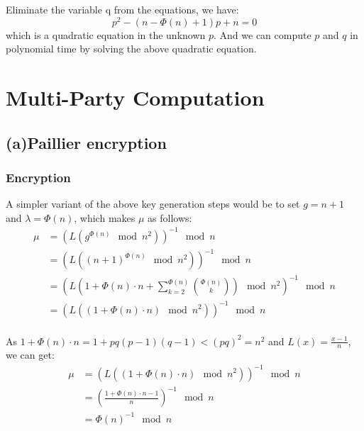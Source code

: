 \documentclass[a4paper,12pt]{article}
\begin{document}
Eliminate the variable q from the equations, we have:
\begin{equation}
    p^2 - (n - \Phi(n) + 1)p + n = 0
\end{equation}
which is a quadratic equation in the unknown $p$. And we can compute $p$ and $q$ in polynomial time by solving the above quadratic equation.

\section{Multi-Party Computation}
\subsection{(a)Paillier encryption}
\subsubsection{Encryption}
A simpler variant of the above key generation steps would be to set $g = n + 1$ and $\lambda = \Phi(n)$, which makes $\mu$ as follows:
\begin{equation}
    \begin{aligned}
        \mu & = (L(g^{\Phi(n)} \mod n^2))^{-1} \mod n                                                            \\
            & = (L((n + 1)^{\Phi(n)} \mod n^2))^{-1} \mod n                                                      \\
            & = (L(1 + \Phi(n)\cdot n + \sum\limits_{k = 2}^{\Phi(n)}\binom{\Phi(n)}{k}) \mod n^2)^{-1} \mod n \\
            & = (L((1 + \Phi(n)\cdot n) \mod n^2))^{-1} \mod n                                                 \\
    \end{aligned}
\end{equation}

As $1 + \Phi(n)\cdot n = 1 + pq(p - 1)(q - 1) < (pq)^2 = n^2$ and $L(x) = \frac{x - 1}{n}$, we can get:
\begin{equation}
    \begin{aligned}
        \mu & = (L((1 + \Phi(n)\cdot n) \mod n^2))^{-1} \mod n \\
            & = (\frac{1 + \Phi(n)\cdot n - 1}{n})^{-1} \mod n \\
            & = \Phi(n)^{-1} \mod n                            \\
    \end{aligned}
\end{equation}
\end{document}
